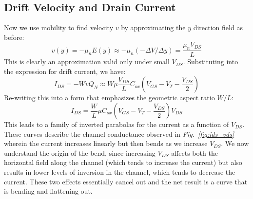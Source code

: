 \subsection{Drift Velocity and Drain Current}
Now we use mobility to find velocity $v$ by approximating the $y$ direction field as before:
    \begin{equation}
        v(y) =  - {\mu _n}E(y) \approx  - {\mu _n}( - \Delta V/\Delta y) = \frac{{{\mu _n}{V_{DS}}}}{L}
    \end{equation}
This is clearly an approximation valid only under small $V_{DS}$.  Substituting into the expression for drift current, we have:
    \begin{equation}
        I_{DS} =  - Wv{Q_N} \approx W\mu \frac{{{V_{DS}}}}{L}{C_{ox}}({V_{GS}} - {V_T} - \frac{{{V_{DS}}}}{2})
    \end{equation}
Re-writing this into a form that emphasizes the geometric aspect ratio $W/L$:
    \begin{equation}
        I_{DS} = \frac{W}{L}\mu {C_{ox}}({V_{GS}} - {V_T} - \frac{{{V_{DS}}}}{2}){V_{DS}}
    \end{equation}
This leads to a family of inverted parabolas for the current as a function of $V_{DS}$.  These curves describe the channel conductance observed in \emph{Fig.~\ref{fig:ids_vds}} wherein the current increases linearly but then bends as we increase $V_{DS}$.  We now understand the origin of the bend, since increasing $V_{DS}$ affects both the horizontal field along the channel (which tends to increase the current) but also results in lower levels of inversion in the channel, which tends to decrease the current.  These two effects essentially cancel out and the net result is a curve that is bending and flattening out.

